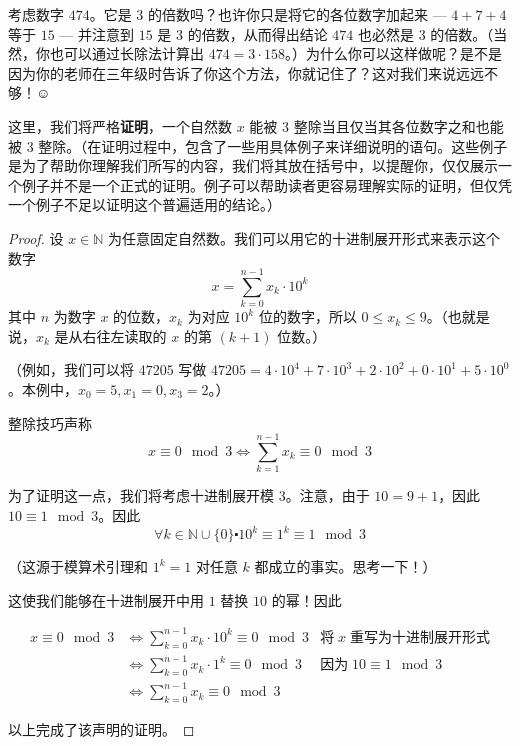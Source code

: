 \begin{example}\label{ex:example6.5.13}
    考虑数字 $474$。它是 $3$ 的倍数吗？也许你只是将它的各位数字加起来 --- $4 + 7 + 4$ 等于 $15$ --- 并注意到 $15$ 是 $3$ 的倍数，从而得出结论 $474$ 也必然是 $3$ 的倍数。（当然，你也可以通过长除法计算出 $474 = 3 \cdot 158$。）为什么你可以这样做呢？是不是因为你的老师在三年级时告诉了你这个方法，你就记住了？这对我们来说远远不够！$\smiley{}$

    这里，我们将严格\textbf{证明}，一个自然数 $x$ 能被 $3$ 整除当且仅当其各位数字之和也能被 $3$ 整除。（在证明过程中，包含了一些用具体例子来详细说明的语句。这些例子是为了帮助你理解我们所写的内容，我们将其放在括号中，以提醒你，仅仅展示一个例子并不是一个正式的证明。例子可以帮助读者更容易理解实际的证明，但仅凭一个例子不足以证明这个普遍适用的结论。）

    \begin{proof}
        设 $x \in \mathbb{N}$ 为任意固定自然数。我们可以用它的十进制展开形式来表示这个数字
        \[x= \sum_{k=0}^{n-1} x_k \cdot 10^k\]
        其中 $n$ 为数字 $x$ 的位数，$x_k$ 为对应 $10^k$ 位的数字，所以 $0 \le x_k \le 9$。（也就是说，$x_k$ 是从右往左读取的 $x$ 的第 $(k + 1)$ 位数。）

        （例如，我们可以将 $47205$ 写做 $47205=4 \cdot 10^4+7 \cdot 10^3+2 \cdot 10^2+0 \cdot 10^1+5 \cdot 10^0$。本例中，$x_0 = 5, x_1=0, x_3=2$。）

        整除技巧声称
        \[x \equiv 0 \mod 3 \iff \sum_{k=1}^{n-1} x_k \equiv 0 \mod 3\]

        为了证明这一点，我们将考虑十进制展开模 $3$。注意，由于 $10=9+1$，因此 $10 \equiv 1 \mod 3$。因此
        \[\forall k \in \mathbb{N} \cup \{0\} \centerdot 10^k \equiv 1^k \equiv 1 \mod 3\]

        （这源于模算术引理和 $1^k = 1$ 对任意 $k$ 都成立的事实。思考一下！）

        这使我们能够在十进制展开中用 $1$ 替换 $10$ 的幂！因此

        \begin{align*}
            x \equiv 0 \mod 3 &\iff \sum_{k=0}^{n-1} x_k \cdot 10^k \equiv 0 \mod 3 &\text{将}\; x \;\text{重写为十进制展开形式}\\
            &\iff \sum_{k=0}^{n-1} x_k \cdot 1^k \equiv 0 \mod 3 &\text{因为}\; 10 \equiv 1 \mod 3 \\
            &\iff \sum_{k=0}^{n-1} x_k \equiv 0 \mod 3
        \end{align*}

        以上完成了该声明的证明。
    \end{proof}


\end{example}
